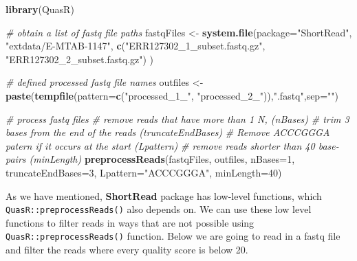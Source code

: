 \documentclass[12pt,]{krantz}
\newenvironment{Shaded}{\begin{snugshade}}{\end{snugshade}}
\newcommand{\CommentTok}[1]{\textcolor[rgb]{0.56,0.35,0.01}{\textit{#1}}}
\newcommand{\DataTypeTok}[1]{\textcolor[rgb]{0.13,0.29,0.53}{#1}}
\newcommand{\DecValTok}[1]{\textcolor[rgb]{0.00,0.00,0.81}{#1}}
\newcommand{\KeywordTok}[1]{\textcolor[rgb]{0.13,0.29,0.53}{\textbf{#1}}}
\newcommand{\NormalTok}[1]{#1}
\newcommand{\StringTok}[1]{\textcolor[rgb]{0.31,0.60,0.02}{#1}}
\begin{document}
\begin{Shaded}
\begin{Highlighting}[]
\KeywordTok{library}\NormalTok{(QuasR)}

\CommentTok{# obtain a list of fastq file paths}
\NormalTok{fastqFiles <-}\StringTok{ }\KeywordTok{system.file}\NormalTok{(}\DataTypeTok{package=}\StringTok{"ShortRead"}\NormalTok{,}
                          \StringTok{"extdata/E-MTAB-1147"}\NormalTok{,}
                          \KeywordTok{c}\NormalTok{(}\StringTok{"ERR127302_1_subset.fastq.gz"}\NormalTok{,}
                            \StringTok{"ERR127302_2_subset.fastq.gz"}\NormalTok{)}
\NormalTok{)}

\CommentTok{# defined processed fastq file names}
\NormalTok{outfiles <-}\StringTok{ }\KeywordTok{paste}\NormalTok{(}\KeywordTok{tempfile}\NormalTok{(}\DataTypeTok{pattern=}\KeywordTok{c}\NormalTok{(}\StringTok{"processed_1_"}\NormalTok{,}
                              \StringTok{"processed_2_"}\NormalTok{)),}\StringTok{".fastq"}\NormalTok{,}\DataTypeTok{sep=}\StringTok{""}\NormalTok{)}

\CommentTok{# process fastq files}
\CommentTok{# remove reads that have more than 1 N, (nBases)}
\CommentTok{# trim 3 bases from the end of the reads (truncateEndBases)}
\CommentTok{# Remove ACCCGGGA patern if it occurs at the start (Lpattern)}
\CommentTok{# remove reads shorter than 40 base-pairs (minLength)}
\KeywordTok{preprocessReads}\NormalTok{(fastqFiles, outfiles, }
                \DataTypeTok{nBases=}\DecValTok{1}\NormalTok{,}
                \DataTypeTok{truncateEndBases=}\DecValTok{3}\NormalTok{,}
                \DataTypeTok{Lpattern=}\StringTok{"ACCCGGGA"}\NormalTok{,}
                \DataTypeTok{minLength=}\DecValTok{40}\NormalTok{)}
\end{Highlighting}
\end{Shaded}

As we have mentioned, \textbf{ShortRead} package has low-level functions, which \texttt{QuasR::preprocessReads()} also depends on. We can use these low level functions to filter reads in ways that are not possible using \texttt{QuasR::preprocessReads()} function. Below we are going to read in a fastq file and filter the reads where every quality score is below 20.
\end{document}
